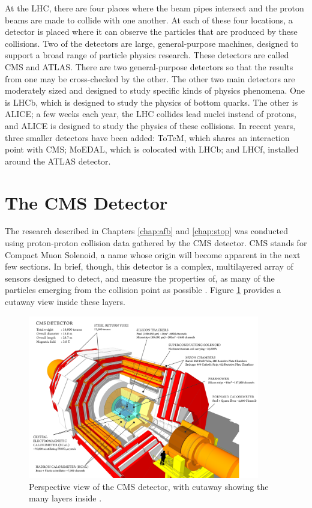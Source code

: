 At the LHC, there are four places where the beam pipes intersect and
the proton beams are made to collide with one another. At each of these
four locations, a detector is placed where it can observe the
particles that are produced by these collisions. Two of
the detectors are large, general-purpose machines, designed to support
a broad range of particle physics research. These detectors are called CMS
and ATLAS. There are two general-purpose detectors so that the results from one
may be cross-checked by the other. The other two main
detectors are moderately sized and designed to study specific kinds of physics
phenomena. One is LHCb, which is designed to study the physics of
bottom quarks. The other is ALICE; a few weeks each year, the LHC
collides lead nuclei instead of protons, and ALICE is designed to
study the physics of these collisions. In recent years, three smaller detectors have
been added: ToTeM, which shares an interaction point with CMS; MoEDAL,
which is colocated with LHCb; and LHCf, installed around the ATLAS detector.

\section{The CMS Detector}
\label{sec:cms}

The research described in Chapters \ref{chap:afb} and \ref{chap:stop}
was conducted using proton-proton collision data gathered by the
CMS detector. CMS stands for Compact Muon Solenoid, a name whose
origin will become apparent in the next few sections. In brief, though,
this detector is a complex, multilayered array of sensors designed to
detect, and measure the properties of, as many of the particles emerging
from the collision point as possible \cite{cms}. Figure
\ref{fig:cms:outside} provides a cutaway view inside these layers.

\begin{figure}[htb]
\centering
\includegraphics[width=0.9\textwidth]{figures/cms-cutaway.png}
\caption[Perspective view of the CMS detector, with cutaway showing
the many layers inside.]{Perspective view of the CMS detector, with
  cutaway showing the many layers inside \cite{websitecms}.}
\label{fig:cms:outside}
\end{figure}

